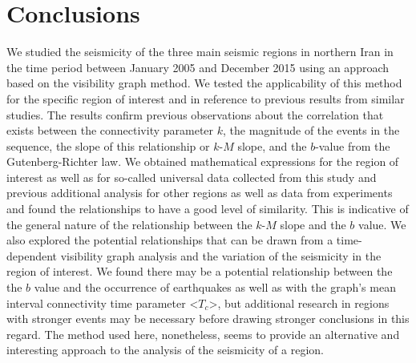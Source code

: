 
\section{Conclusions}

We studied the seismicity of the three main seismic regions in northern Iran in the time period between January 2005 and December 2015 using an approach based on the visibility graph method. We tested the applicability of this method for the specific region of interest and in reference to previous results from similar studies. The results confirm previous observations about the correlation that exists between the connectivity parameter $k$, the magnitude of the events in the sequence, the slope of this relationship or $k$-$M$ slope, and the $b$-value from the Gutenberg-Richter law. We obtained mathematical expressions for the region of interest as well as for so-called universal data collected from this study and previous additional analysis for other regions as well as data from experiments and found the relationships to have a good level of similarity. This is indicative of the general nature of the relationship between the $k$-$M$ slope and the $b$ value. We also explored the potential relationships that can be drawn from a time-dependent visibility graph analysis and the variation of the seismicity in the region of interest. We found there may be a potential relationship between the the $b$ value and the occurrence of earthquakes as well as with the graph's mean interval connectivity time parameter <$T_c$>, but additional research in regions with stronger events may be necessary before drawing stronger conclusions in this regard. The method used here, nonetheless, seems to provide an alternative and interesting approach to the analysis of the seismicity of a region.

